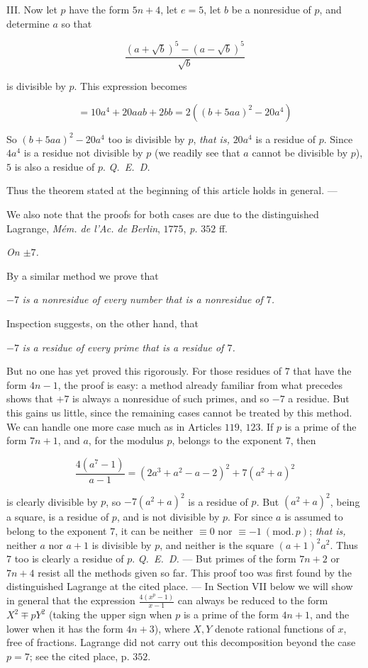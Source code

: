 III. Now let $p$ have the form $5n+4$, let $e=5$, let $b$ be a nonresidue of $p$, and determine $a$ so that

\[
\frac{(a+\surd b)^5-(a-\surd b)^5}{\surd b}
\]

is divisible by $p$. This expression becomes

\[
=10a^4+20aab+2bb=2((b+5aa)^2-20a^4)
\]

So $(b+5aa)^2-20a^4$ too is divisible by $p$, \textit{that is,} $20a^4$ is a residue of $p$. Since $4a^4$ is a residue not divisible by $p$ (we readily see that $a$ cannot be divisible by $p$), $5$ is also a residue of $p$. \mbox{\textit{Q. E. D.}}

Thus the theorem stated at the beginning of this article holds in general. ---

We also note that the proofs for both cases are due to the distinguished Lagrange, \textit{M\'em. de l'Ac. de Berlin}, $1775$, \textit{p.} $352$ ff.

\begin{center}\textit{On $\pm7$.}\end{center}

By a similar method we prove that

$-7$ \textit{is a nonresidue of every number that is a nonresidue of $7$.}

Inspection suggests, on the other hand, that

$-7$ \textit{is a residue of every prime that is a residue of $7$.}

But no one has yet proved this rigorously. For those residues of $7$ that have the form $4n-1$, the proof is easy: a method already familiar from what precedes shows that $+7$ is always a nonresidue of such primes, and so $-7$ a residue. But this gains us little, since the remaining cases cannot be treated by this method. We can handle one more case much as in Articles $119$, $123$. If $p$ is a prime of the form $7n+1$, and $a$, for the modulus $p$, belongs to the exponent $7$, then

\[
\frac{4(a^7-1)}{a-1}=(2a^3+a^2-a-2)^2+7(a^2+a)^2
\]

is clearly divisible by $p$, so $-7(a^2+a)^2$ is a residue of $p$. But $(a^2+a)^2$, being a square, is a residue of $p$, and is not divisible by $p$. For since $a$ is assumed to belong to the exponent $7$, it can be neither $\equiv0$ nor $\equiv-1\ (\mathrm{mod.}\,p)$; \textit{that is,} neither $a$ nor $a+1$ is divisible by $p$, and neither is the square $(a+1)^2a^2$. Thus $7$ too is clearly a residue of $p$. \mbox{\textit{Q. E. D.}} --- But primes of the form $7n+2$ or $7n+4$ resist all the methods given so far. This proof too was first found by the distinguished Lagrange at the cited place. --- In Section VII below we will show in general that the expression $\frac{4(x^p-1)}{x-1}$ can always be reduced to the form $X^2\mp pY^2$ (taking the upper sign when $p$ is a prime of the form $4n+1$, and the lower when it has the form $4n+3$), where $X,Y$ denote rational functions of $x$, free of fractions. Lagrange did not carry out this decomposition beyond the case $p=7$; see the cited place, p. $352$.

